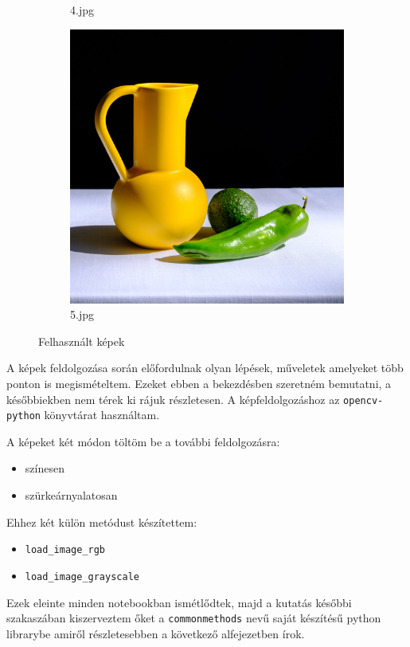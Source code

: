 \begin{figure}[htb]
\begin{subfigure}{0.25\textwidth}
  \caption*{4.jpg}
  \label{fig:4jpg}
\end{subfigure}\hfil %
\begin{subfigure}{0.25\textwidth}
  \includegraphics[width=\linewidth]{../images/5.jpg}
  \caption*{5.jpg}
  \label{fig:5jpg}
\end{subfigure}
\caption{Felhasznált képek}
\label{fig:images}
\end{figure}


A képek feldolgozása során előfordulnak olyan lépések, műveletek amelyeket több ponton is megismételtem. Ezeket ebben a bekezdésben szeretném bemutatni, a későbbiekben nem térek ki rájuk részletesen.
A képfeldolgozáshoz az \texttt{opencv-python} könyvtárat használtam.


A képeket két módon töltöm be a további feldolgozásra:
\begin{itemize}
\item színesen
\item szürkeárnyalatosan
\end{itemize}
Ehhez két külön metódust készítettem:
\begin{itemize}
\item \texttt{load\_image\_rgb}
\item \texttt{load\_image\_grayscale}
\end{itemize}
Ezek eleinte minden notebookban ismétlődtek, majd a kutatás későbbi szakaszában kiszerveztem őket a \texttt{commonmethods} nevű saját készítésű python librarybe amiről részletesebben a következő alfejezetben írok.

